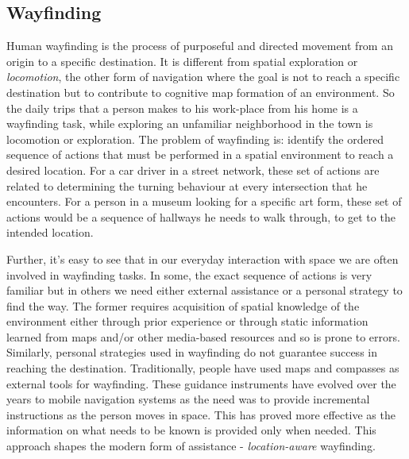 \documentclass{iitkthesis}
\begin{document}
\subsection{Wayfinding}
Human wayfinding is the process of purposeful and directed movement from 
an origin to a specific destination. It is different from spatial 
exploration or \textit{locomotion}, the other form of navigation where 
the goal is not to reach a specific destination but to contribute to 
cognitive map formation of an environment. So the daily trips that a 
person makes to his work-place from his home is a wayfinding task, while 
exploring an unfamiliar neighborhood in the town is locomotion or 
exploration. The problem of wayfinding is: identify the ordered 
sequence of actions that must be performed in a spatial environment to reach 
a desired location. For a car driver in a street network, these set of 
actions are related to determining the turning behaviour at every 
intersection that he encounters. For a person in a museum looking for a 
specific art form, these set of actions would be a sequence of hallways 
he needs to walk through, to get to the intended location. 

Further, it's easy to see that in our everyday interaction with space 
we are often involved in wayfinding tasks. In some, the exact sequence of 
actions is very familiar but in 
others we need either external assistance or a personal strategy to 
find the way. The former requires acquisition of spatial knowledge 
of the environment either through prior experience or through static 
information learned from maps and/or other media-based resources and so 
is prone to errors. Similarly, personal strategies used in wayfinding do 
not guarantee success in reaching the destination. Traditionally, 
people have used maps and compasses as external tools for 
wayfinding. These guidance instruments have evolved over the years to 
mobile navigation systems as the need was to provide incremental 
instructions as the person moves in space. This has 
proved more effective as the information on what needs to be known 
is provided only when needed. This approach shapes the 
modern form of assistance - \textit{location-aware} wayfinding. 
\end{document}
